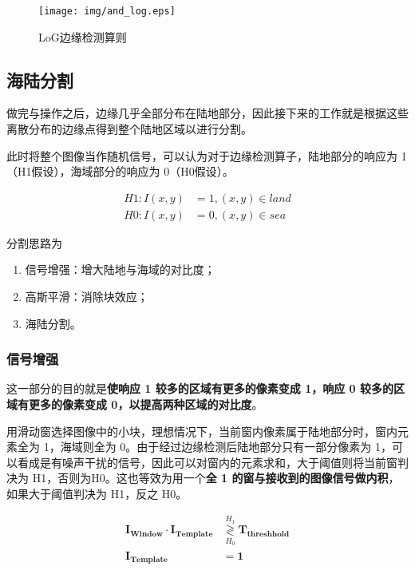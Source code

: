 \documentclass[UTF8,12pt]{ctexart}
\begin{document}
\begin{figure}[!htbp]
	\centering
	\texttt{[image: img/and\_log.eps]}
	\caption{LoG边缘检测算则}
	\label{img_edge_log}
\end{figure}


\subsection{海陆分割}
做完与操作之后，边缘几乎全部分布在陆地部分，因此接下来的工作就是根据这些离散分布的边缘点得到整个陆地区域以进行分割。

此时将整个图像当作随机信号，可以认为对于边缘检测算子，陆地部分的响应为 1（H1假设），海域部分的响应为 0（H0假设）。

\begin{align*}   %
H1: I(x,y) &= 1, (x,y) \in land \\
H0: I(x,y) &= 0, (x,y) \in sea
\end{align*}

分割思路为

\begin{enumerate}
\setlength{\itemsep}{5pt}
\setlength{\parsep}{0pt}
\setlength{\parskip}{0pt}

	\item 信号增强：增大陆地与海域的对比度；
	\item 高斯平滑：消除块效应；
	\item 海陆分割。
\end{enumerate}

\subsubsection{信号增强}

这一部分的目的就是\textbf{使响应 1 较多的区域有更多的像素变成 1，响应 0 较多的区域有更多的像素变成 0，以提高两种区域的对比度}。

用滑动窗选择图像中的小块，理想情况下，当前窗内像素属于陆地部分时，窗内元素全为 1，海域则全为 0。由于经过边缘检测后陆地部分只有一部分像素为 1，可以看成是有噪声干扰的信号，因此可以对窗内的元素求和，大于阈值则将当前窗判决为 H1，否则为H0。这也等效为用一个\textbf{全 1 的窗与接收到的图像信号做内积}，如果大于阈值判决为 H1，反之 H0。

\begin{align*}
\boldsymbol{I_{Window} \cdot I_{Template}} &\mathop{\gtrless}\limits_{H_0}^{H_1} \boldsymbol{T_{threshhold}} \\
\boldsymbol{I_{Template}} &= \mathbf{1}
\end{align*}
\end{document}
